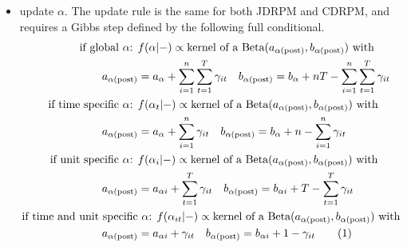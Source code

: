 \documentclass[12pt,	%
	a4paper,		%
	twoside,		%
	openright,		%
	titlepage,%
	]{book}
\newcommand\numberthis{\addtocounter{equation}{1}\tag{\theequation}}
\theoremstyle{definition}
\begin{document}
\begin{itemize}
\item update $\alpha$. The update rule is the same for both JDRPM and CDRPM, and requires a Gibbs step defined by the following full conditional.
\begin{align*}
    \text{if global $\alpha$: } & f(\alpha|-)\propto \text{kernel of a $\Beta(a_{\postp{\alpha}},b_{\postp{\alpha}})$ with}\\
    a_{\postp{\alpha}} &= a_\alpha+\sum_{i=1}^n \sum_{t=1}^T \gamma_{it} \quad
    b_{\postp{\alpha}} = b_\alpha+nT-\sum_{i=1}^n \sum_{t=1}^T \gamma_{it}\\
    \text{if time specific $\alpha$: } & f(\alpha_t|-)\propto \text{kernel of a $\Beta(a_{\postp{\alpha}},b_{\postp{\alpha}})$ with}\\
    a_{\postp{\alpha}} &= a_\alpha+\sum_{i=1}^n \gamma_{it} \quad
    b_{\postp{\alpha}} = b_\alpha+n-\sum_{i=1}^n \gamma_{it}\\
    \text{if unit specific $\alpha$: } & f(\alpha_i|-)\propto \text{kernel of a $\Beta(a_{\postp{\alpha}},b_{\postp{\alpha}})$ with}\\
    a_{\postp{\alpha}} &= a_{\alpha i}+\sum_{t=1}^T \gamma_{it} \quad
    b_{\postp{\alpha}} = b_{\alpha i}+T-\sum_{t=1}^T \gamma_{it}\\
    \text{if time and unit specific} & \text{ $\alpha$: } f(\alpha_{it}|-)\propto \text{kernel of a $\Beta(a_{\postp{\alpha}},b_{\postp{\alpha}})$ with}\\
    a_{\postp{\alpha}} &= a_{\alpha i}+\gamma_{it} \quad
    b_{\postp{\alpha}} = b_{\alpha i}+1- \gamma_{it}
    \numberthis \label{update alpha}
\end{align*}


\end{itemize}
\end{document}
